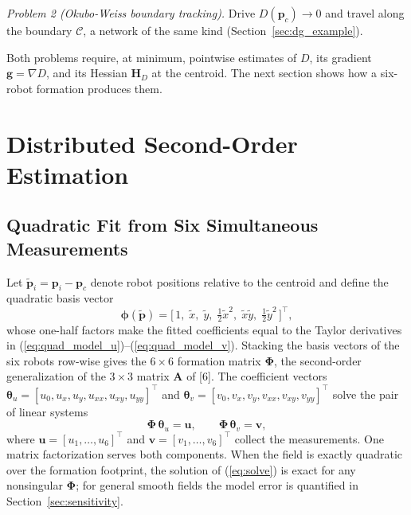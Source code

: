 \documentclass[lettersize,journal]{IEEEtran}
\begin{document}
\emph{Problem 2 (Okubo-Weiss boundary tracking).} Drive $D(\mathbf{p}_c)
\to 0$ and travel along the boundary $\mathcal{C}$, a network of the same
kind (Section~\ref{sec:dg_example}).

Both problems require, at minimum, pointwise estimates of $D$, its
gradient $\mathbf{g} = \nabla D$, and its Hessian $\mathbf{H}_D$ at the
centroid. The next section shows how a six-robot formation produces them.


\section{Distributed Second-Order Estimation}
\label{sec:estimation}

\subsection{Quadratic Fit from Six Simultaneous Measurements}

Let $\tilde{\mathbf{p}}_i = \mathbf{p}_i - \mathbf{p}_c$ denote robot
positions relative to the centroid and define the quadratic basis vector
\begin{equation}
    \boldsymbol{\phi}(\tilde{\mathbf{p}}) =
    \bigl[\,1, \; \tilde{x}, \; \tilde{y}, \; \tfrac{1}{2}\tilde{x}^2, \;
    \tilde{x}\tilde{y}, \; \tfrac{1}{2}\tilde{y}^2\,\bigr]^\top,
    \label{eq:basis}
\end{equation}
whose one-half factors make the fitted coefficients equal to the Taylor
derivatives in (\ref{eq:quad_model_u})--(\ref{eq:quad_model_v}). Stacking
the basis vectors of the six robots row-wise gives the $6 \times 6$
formation matrix $\boldsymbol{\Phi}$, the second-order generalization of
the $3 \times 3$ matrix $\mathbf{A}$ of [6]. The coefficient vectors
$\boldsymbol{\theta}_u = [u_0, u_x, u_y, u_{xx}, u_{xy}, u_{yy}]^\top$ and
$\boldsymbol{\theta}_v = [v_0, v_x, v_y, v_{xx}, v_{xy}, v_{yy}]^\top$
solve the pair of linear systems
\begin{equation}
    \boldsymbol{\Phi}\,\boldsymbol{\theta}_u = \mathbf{u}, \qquad
    \boldsymbol{\Phi}\,\boldsymbol{\theta}_v = \mathbf{v},
    \label{eq:solve}
\end{equation}
where $\mathbf{u} = [u_1, \ldots, u_6]^\top$ and $\mathbf{v} = [v_1,
\ldots, v_6]^\top$ collect the measurements. One matrix factorization
serves both components. When the field is exactly quadratic over the
formation footprint, the solution of (\ref{eq:solve}) is exact for any
nonsingular $\boldsymbol{\Phi}$; for general smooth fields the model
error is quantified in Section~\ref{sec:sensitivity}.
\end{document}
